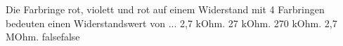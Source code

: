     {Die Farbringe rot, violett und rot auf einem Widerstand mit 4 Farbringen bedeuten einen Widerstandswert von ...}
    {2,7 kOhm.}
    {27 kOhm.}
    {270 kOhm.}
    {2,7 MOhm.}
    {false}{false}